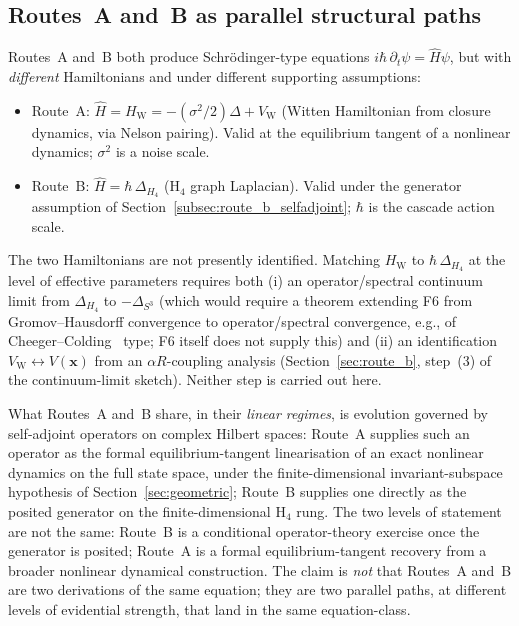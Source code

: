 \documentclass[12pt]{article}
\newcommand{\VW}{V_{\mathrm{W}}}
\newcommand{\HW}{H_{\mathrm{W}}}
\begin{document}
\subsection{Routes~A and~B as parallel structural paths}\label{subsec:routes_parallel}

Routes~A and~B both produce Schr\"odinger-type equations $i\hbar\,\partial_t\psi = \hat H\psi$, but with \emph{different} Hamiltonians and under different supporting assumptions:

\begin{itemize}
    \item Route~A: $\hat H = \HW = -(\sigma^2/2)\Delta + \VW$ (Witten Hamiltonian from closure dynamics, via Nelson pairing). Valid at the equilibrium tangent of a nonlinear dynamics; $\sigma^2$ is a noise scale.
    \item Route~B: $\hat H = \hbar\,\Delta_{H_4}$ (H${}_4$ graph Laplacian). Valid under the generator assumption of Section~\ref{subsec:route_b_selfadjoint}; $\hbar$ is the cascade action scale.
\end{itemize}

The two Hamiltonians are not presently identified. Matching $\HW$ to $\hbar\,\Delta_{H_4}$ at the level of effective parameters requires both (i) an operator/spectral continuum limit from $\Delta_{H_4}$ to $-\Delta_{S^3}$ (which would require a theorem extending F6 from Gromov--Hausdorff convergence to operator/spectral convergence, e.g., of Cheeger--Colding~\citep{CheegerColding1997} type; F6 itself does not supply this) and (ii) an identification $\VW \leftrightarrow V(\mathbf{x})$ from an $\alpha R$-coupling analysis (Section~\ref{sec:route_b}, step~(3) of the continuum-limit sketch). Neither step is carried out here.

What Routes~A and~B share, in their \emph{linear regimes}, is evolution governed by self-adjoint operators on complex Hilbert spaces: Route~A supplies such an operator as the formal equilibrium-tangent linearisation of an exact nonlinear dynamics on the full state space, under the finite-dimensional invariant-subspace hypothesis of Section~\ref{sec:geometric}; Route~B supplies one directly as the posited generator on the finite-dimensional H${}_4$ rung. The two levels of statement are not the same: Route~B is a conditional operator-theory exercise once the generator is posited; Route~A is a formal equilibrium-tangent recovery from a broader nonlinear dynamical construction. The claim is \emph{not} that Routes~A and~B are two derivations of the same equation; they are two parallel paths, at different levels of evidential strength, that land in the same equation-class.
\end{document}
